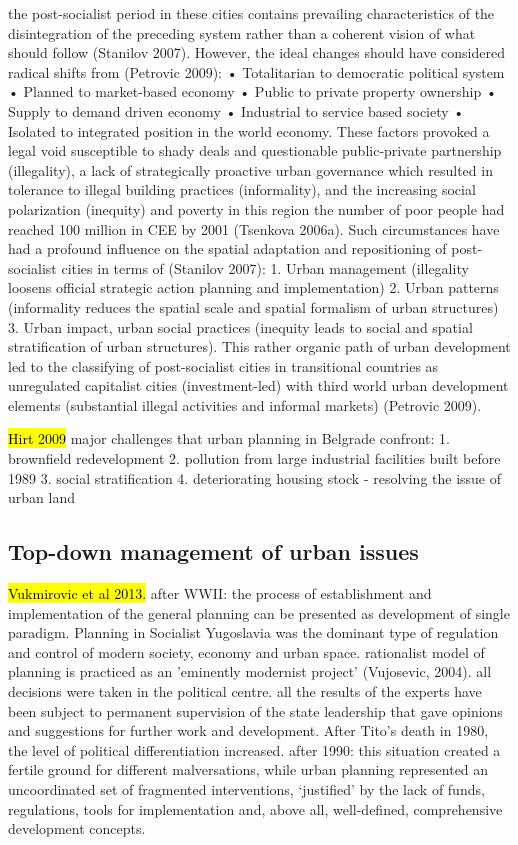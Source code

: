 \documentclass[11pt]{report}
\begin{document}
the post-socialist period in these cities contains prevailing characteristics of the disintegration of the preceding system rather than a coherent vision of what should follow (Stanilov 2007). However, the ideal changes should have considered radical shifts from (Petrovic 2009):
•	Totalitarian to democratic political system
•	Planned to market-based economy
•	Public to private property ownership
•	Supply to demand driven economy
•	Industrial to service based society
•	Isolated to integrated position in the world economy.
These factors provoked a legal void susceptible to shady deals and questionable public-private partnership (illegality), a lack of strategically proactive urban governance which resulted in tolerance to illegal building practices (informality), and the increasing social polarization (inequity) and poverty in this region {the number of poor people had reached 100 million in CEE by 2001 (Tsenkova 2006a)}. Such circumstances have had a profound influence on the spatial adaptation and repositioning of post-socialist cities in terms of (Stanilov 2007):
1. Urban management (illegality loosens official strategic action planning and implementation)
2. Urban patterns (informality reduces the spatial scale and spatial formalism of urban structures)
3. Urban impact, urban social practices (inequity leads to social and spatial stratification of urban structures).
This rather organic path of urban development led to the classifying of post-socialist cities in transitional countries as unregulated capitalist cities (investment-led) with third world urban development elements (substantial illegal activities and informal markets) (Petrovic 2009).

\hl{Hirt 2009} 
major challenges that urban planning in Belgrade confront:
1. brownfield redevelopment
2. pollution from large industrial facilities built before 1989
3. social stratification
4. deteriorating housing stock
- resolving the issue of urban land

\subsection{Top-down management of urban issues}

\hl{Vukmirovic et al 2013.}
after WWII: the process of establishment and implementation of the general planning can be presented as development of single  paradigm.
Planning  in  Socialist  Yugoslavia  was  the  dominant  type  of  regulation  and  control  of  modern  society, economy and urban space.
rationalist model of planning is practiced as an 'eminently modernist project' (Vujosevic, 2004). all decisions were taken in the political centre.
all the results of the experts have been subject to permanent supervision of 
the state leadership that gave opinions and suggestions for further work and development. 
After Tito's death in 1980, the level of political differentiation increased.  
after 1990:
this  situation  created  a  fertile  ground  for different malversations,  while urban planning represented an uncoordinated set of fragmented interventions, ‘justified’ by the lack of funds, 
regulations, tools for implementation and, above all, well-defined, comprehensive development concepts.
\end{document}
